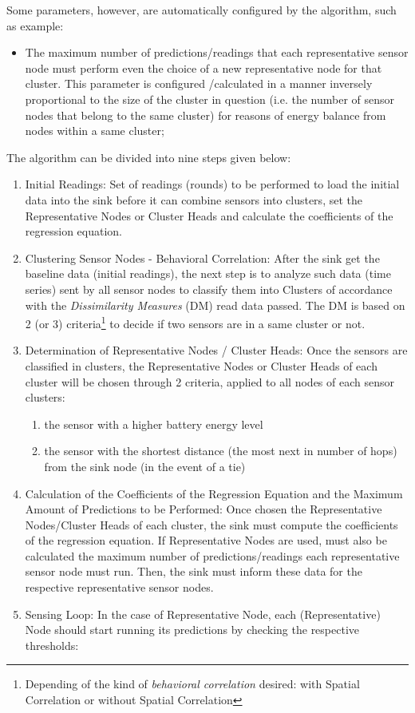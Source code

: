 \documentclass[conference]{IEEEtran}
\begin{document}
Some parameters, however, are automatically configured by the algorithm, such as
example:

\begin{itemize}
  \item The maximum number of predictions/readings that each representative
sensor node must perform even the choice of a new representative node for that
cluster. This parameter is configured /calculated in a manner inversely
proportional to the size of the cluster in question (i.e. the number of sensor
nodes that belong to the same cluster) for reasons of energy balance from 
nodes within a same cluster;  
\end{itemize}

The algorithm can be divided into nine steps given below:

\begin{enumerate}
  \item Initial Readings: Set of readings (rounds) to be performed to load the
initial data into the sink before it can combine sensors into clusters, set the
Representative Nodes or Cluster Heads and calculate the coefficients of the
regression equation.
  \item Clustering Sensor Nodes - Behavioral Correlation: After the sink get the
baseline data (initial readings), the next step is to analyze such data (time
series) sent by all sensor nodes to classify them into Clusters of accordance
with the \textit{Dissimilarity Measures} (DM) read data passed. The DM is based
on 2 (or 3) criteria\footnote{Depending of the kind of \textit{behavioral
correlation} desired: with Spatial Correlation or without Spatial Correlation}
to decide if two sensors are in a same cluster or not.
  \item Determination of Representative Nodes / Cluster Heads: Once the sensors
are classified in clusters, the Representative Nodes or Cluster Heads of each
cluster will be chosen through 2 criteria, applied to all nodes of each sensor
clusters:

  \begin{enumerate}
    \item the sensor with a higher battery energy level
    \item the sensor with the shortest distance (the most
    next in number of hops) from the sink node (in the event of a tie)
  \end{enumerate}

  \item Calculation of the Coefficients of the Regression Equation and the
Maximum Amount of Predictions to be Performed: Once chosen the Representative
Nodes/Cluster Heads of each cluster, the sink must compute the coefficients of
the regression equation. If Representative Nodes are used, must also be
calculated the maximum number of predictions/readings each representative sensor
node must run. Then, the sink must inform these data for the respective
representative sensor nodes.
  \item Sensing Loop: In the case of Representative Node, each (Representative)
Node should start running its predictions by checking the respective thresholds:


\end{enumerate}
\end{document}
